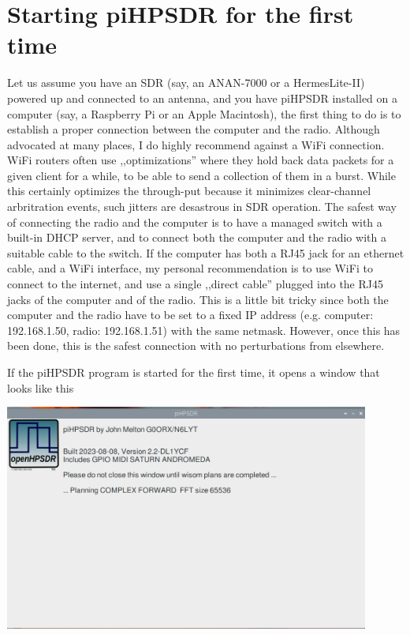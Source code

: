 \documentclass[12pt]{book}
\begin{document}
\chapter{Starting piHPSDR for the first time}
Let us assume you have an SDR (say, an ANAN-7000 or a HermesLite-II) powered up and connected to an antenna,
and you have piHPSDR installed on a computer (say, a Raspberry Pi or an Apple Macintosh), the first thing to
do is to establish a proper connection between the computer and the radio. Although advocated at many places,
I do highly recommend against a WiFi connection. WiFi routers often use ,,optimizations'' where they hold
back data packets for a given client for a while, to be able to send a collection of them in a burst. While
this certainly optimizes the through-put because it minimizes clear-channel arbritration events, such jitters
are desastrous in SDR operation. The safest way of connecting the radio and the computer is to have a
managed switch with a built-in DHCP server, and to connect both the computer and the radio with a suitable
cable to the switch. If the computer has both a RJ45 jack for an ethernet cable, and a WiFi interface, my
personal recommendation is to use WiFi to connect to the internet, and use a single ,,direct cable'' plugged
into the RJ45 jacks of the computer and of the radio. This is a little bit tricky since both the computer
and the radio have to be set to a fixed IP address (e.g. computer: 192.168.1.50, radio: 192.168.1.51) with
the same netmask. However, once this has been done, this is the safest connection with no perturbations from
elsewhere.

\newpage
If the piHPSDR program is started for the first time, it opens a window that looks like this

\begin{center}
\includegraphics[width=12cm]{Planning.png}
\end{center}
\end{document}
